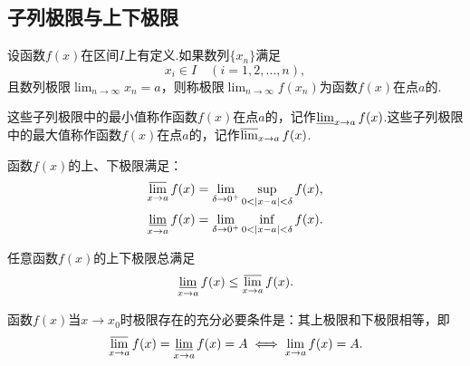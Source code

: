 \subsection{子列极限与上下极限}
\begin{definition}\label{definition:极限.函数的子列极限和上下极限}
设函数\(f(x)\)在区间\(I\)上有定义.如果数列\(\{x_n\}\)满足\[
x_i \in I \quad (i=1,2,\dotsc,n),
\]且数列极限\(\lim_{n\to\infty}{x_n} = a\)，则称极限\(\lim_{n\to\infty}{f(x_n)}\)为函数\(f(x)\)在点\(a\)的.

这些子列极限中的最小值称作函数\(f(x)\)在点\(a\)的，记作\(\varliminf_{x \to a}f(x)\).这些子列极限中的最大值称作函数\(f(x)\)在点\(a\)的，记作\(\varlimsup_{x \to a}f(x)\).
\end{definition}

\begin{property}
函数\(f(x)\)的上、下极限满足：\begin{gather}
\varlimsup_{x \to a} f(x) = \lim_{\delta\to0^+} \sup_{0<\abs{x-a}<\delta} f(x), \\
\varliminf_{x \to a} f(x) = \lim_{\delta\to0^+} \inf_{0<\abs{x-a}<\delta} f(x).
\end{gather}
\end{property}

\begin{theorem}
任意函数\(f(x)\)的上下极限总满足\[
\varliminf_{x \to a} f(x) \leq \varlimsup_{x \to a} f(x).
\]
\end{theorem}

\begin{theorem}
函数\(f(x)\)当\(x \to x_0\)时极限存在的充分必要条件是：其上极限和下极限相等，即\[
\varlimsup_{x \to a} f(x) = \varliminf_{x \to a} f(x) = A
\iff
\lim_{x \to a} f(x) = A.
\]
\end{theorem}


